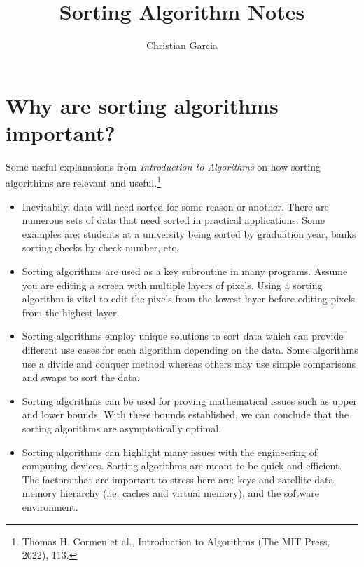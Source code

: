 \documentclass[11pt]{article}
\title{\textbf{Sorting Algorithm Notes}}
\author{Christian Garcia}
\date{}
\begin{document}
\maketitle
\thispagestyle{empty}

\section{Why are sorting algorithms important?}
Some useful explanations from \emph{Introduction to Algorithms} on how sorting algorithims are relevant and useful.\footnote{Thomas H. Cormen et al., Introduction to Algorithms (The MIT Press, 2022), 113.}

\begin{itemize}
\item{Inevitabily, data will need sorted for some reason or another. There are numerous sets of data that need sorted in practical applications. Some examples are: students at a university being sorted by graduation year, banks sorting checks by check number, etc.}
\item{Sorting algorithms are used as a key subroutine in many programs. Assume you are editing a screen with multiple layers of pixels. Using a sorting algorithm is vital to edit the pixels from the lowest layer before editing pixels from the highest layer.}
\item{Sorting algorithms employ unique solutions to sort data which can provide different use cases for each algorithm depending on the data. Some algorithms use a divide and conquer method whereas others may use simple comparisons and swaps to sort the data.}
\item{Sorting algorithms can be used for proving mathematical issues such as upper and lower bounds. With these bounds established, we can conclude that the sorting algorithms are asymptotically optimal.}
\item{Sorting algorithms can highlight many issues with the engineering of computing devices. Sorting algorithms are meant to be quick and efficient. The factors that are important to stress here are: keys and satellite data, memory hierarchy (i.e. caches and virtual memory), and the software environment.}
\end{itemize}
\end{document}
